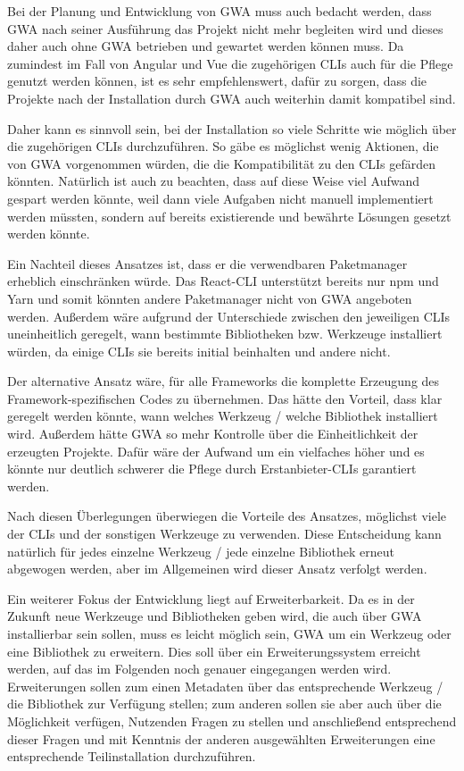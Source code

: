 Bei der Planung und Entwicklung von \gls{GWA} muss auch bedacht werden, dass \gls{GWA} nach seiner Ausführung das Projekt nicht mehr begleiten wird und dieses daher auch ohne \gls{GWA} betrieben und gewartet werden können muss. Da zumindest im Fall von Angular und Vue die zugehörigen \gls{CLI}s auch für die Pflege genutzt werden können, ist es sehr empfehlenswert, dafür zu sorgen, dass die Projekte nach der Installation durch \gls{GWA} auch weiterhin damit kompatibel sind.

\label{decision_use_clis}
Daher kann es sinnvoll sein, bei der Installation so viele Schritte wie möglich über die zugehörigen \gls{CLI}s durchzuführen. So gäbe es möglichst wenig Aktionen, die von \gls{GWA} vorgenommen würden, die die Kompatibilität zu den \gls{CLI}s gefärden könnten. Natürlich ist auch zu beachten, dass auf diese Weise viel Aufwand gespart werden könnte, weil dann viele Aufgaben nicht manuell implementiert werden müssten, sondern auf bereits existierende und bewährte Lösungen gesetzt werden könnte.

Ein Nachteil dieses Ansatzes ist, dass er die verwendbaren Paketmanager erheblich einschränken würde. Das React-\gls{CLI} unterstützt bereits nur \gls{npm} und Yarn \cite{cra_package_managers} und somit könnten andere Paketmanager nicht von \gls{GWA} angeboten werden. Außerdem wäre aufgrund der Unterschiede zwischen den jeweiligen \gls{CLI}s uneinheitlich geregelt, wann bestimmte Bibliotheken bzw. Werkzeuge installiert würden, da einige \gls{CLI}s sie bereits initial beinhalten und andere nicht.

Der alternative Ansatz wäre, für alle Frameworks die komplette Erzeugung des Framework-spezifischen Codes zu übernehmen. Das hätte den Vorteil, dass klar geregelt werden könnte, wann welches Werkzeug / welche Bibliothek installiert wird. Außerdem hätte \gls{GWA} so mehr Kontrolle über die Einheitlichkeit der erzeugten Projekte. Dafür wäre der Aufwand um ein vielfaches höher und es könnte nur deutlich schwerer die Pflege durch Erstanbieter-\gls{CLI}s garantiert werden.

Nach diesen Überlegungen überwiegen die Vorteile des Ansatzes, möglichst viele der \gls{CLI}s und der sonstigen Werkzeuge zu verwenden. Diese Entscheidung kann natürlich für jedes einzelne Werkzeug / jede einzelne Bibliothek erneut abgewogen werden, aber im Allgemeinen wird dieser Ansatz verfolgt werden.

Ein weiterer Fokus der Entwicklung liegt auf Erweiterbarkeit. Da es in der Zukunft neue Werkzeuge und Bibliotheken geben wird, die auch über \gls{GWA} installierbar sein sollen, muss es leicht möglich sein, \gls{GWA} um ein Werkzeug oder eine Bibliothek zu erweitern. Dies soll über ein Erweiterungssystem erreicht werden, auf das im Folgenden noch genauer eingegangen werden wird. Erweiterungen sollen zum einen Metadaten über das entsprechende Werkzeug / die Bibliothek zur Verfügung stellen; zum anderen sollen sie aber auch über die Möglichkeit verfügen, Nutzenden Fragen zu stellen und anschließend entsprechend dieser Fragen und mit Kenntnis der anderen ausgewählten Erweiterungen eine entsprechende Teilinstallation durchzuführen.

